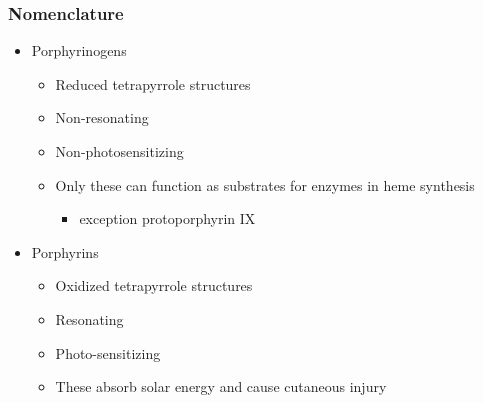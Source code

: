 \documentclass{scrartcl}
\begin{document}
\subsubsection{Nomenclature}
\label{sec:org10ddc4c}
\begin{itemize}
\item Porphyrinogens
\begin{itemize}
\item Reduced tetrapyrrole structures
\item Non-resonating
\item Non-photosensitizing
\item Only these can function as substrates for enzymes in heme synthesis
\begin{itemize}
\item exception protoporphyrin IX
\end{itemize}
\end{itemize}

\item Porphyrins
\begin{itemize}
\item Oxidized tetrapyrrole structures
\item Resonating
\item Photo-sensitizing
\item These absorb solar energy and cause cutaneous injury
\end{itemize}
\end{itemize}
\end{document}
